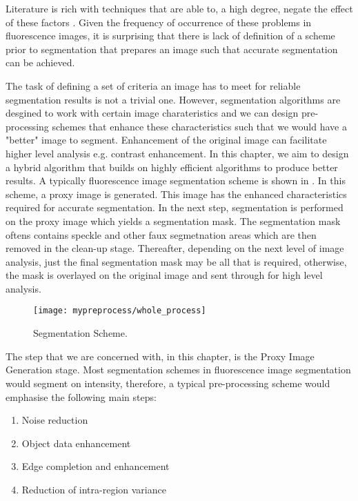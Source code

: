 Literature is rich with techniques that are able to, a high degree, negate the effect of these factors \cite{Lysaker2004,Wang2008,Zhou2013}. Given the frequency of occurrence of these problems in fluorescence images, it is surprising that there is lack of definition of a scheme prior to segmentation that prepares an image such that accurate segmentation can be achieved.

The task of defining a set of criteria an image has to meet for reliable segmentation results is not a trivial one.
However, segmentation algorithms are desgined to work with certain image charateristics and we can design pre-processing schemes that enhance these characteristics such that  we would have a "better" image to segment. Enhancement of the original image can facilitate higher level analysis e.g. contrast enhancement.
In this chapter, we aim to design a hybrid algorithm that builds on highly efficient algorithms to produce better results. A typically fluorescence image segmentation scheme is shown in .
In this scheme, a proxy image is generated. This image has the enhanced characteristics required for accurate segmentation. In the next step, segmentation is performed on the proxy image which yields a segmentation mask. The segmentation mask oftens contains speckle and other faux segmetnation areas which are then removed in the clean-up stage.
Thereafter, depending on the next level of image analysis, just the final segmentation mask may be all that is required, otherwise, the mask is overlayed on the original image and sent through for high level analysis.

\begin{figure}[!h]
	\centering
	\texttt{[image: mypreprocess/whole\_process]}
	\caption{Segmentation Scheme.}
	\label{fig:wholescheme}
\end{figure}

The step that we are concerned with, in this chapter, is the Proxy Image Generation stage. Most segmentation schemes in fluorescence image segmentation would segment on intensity, therefore, a typical pre-processing scheme would emphasise the following main steps:

\begin{enumerate}
	\item Noise reduction
	\item Object data enhancement
	\item Edge completion and enhancement
	\item Reduction of intra-region variance
\end{enumerate}

